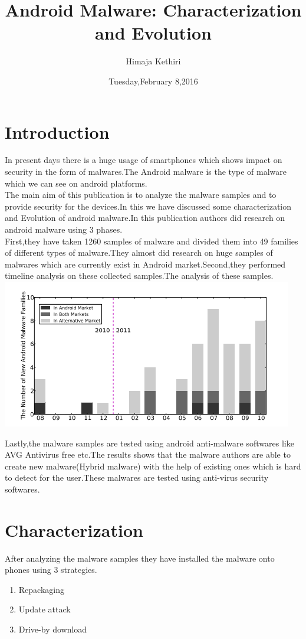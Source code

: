 \documentclass[10pt]{article}
\title{Android Malware: Characterization and Evolution}
\author{Himaja Kethiri}
\date{Tuesday,February 8,2016}
\begin{document}
\maketitle
\section{Introduction}
In present days there is a huge usage of smartphones which shows impact on security in the form of malwares.The Android malware is the type of malware which we can see on android platforms.\\

The main aim of this publication is to analyze the malware samples and to provide security for the devices.In this we have discussed some characterization and Evolution of android malware.In this publication authors did research on android malware using 3 phases.\\

First,they have taken 1260 samples of malware and divided them into 49 families of different types of malware.They almost did research on huge samples of malwares which are currently exist in Android market.Second,they performed timeline analysis on these collected samples.The analysis of these samples. \\
\includegraphics{pic.PNG}


Lastly,the malware samples are tested using android anti-malware softwares like AVG Antivirus free  etc.The results shows that the malware authors are able to create new malware(Hybrid malware) with the help of existing ones which is hard to detect for the user.These malwares are tested using anti-virus security softwares.\\

\section{Characterization}
     After analyzing the malware samples they have installed the malware onto phones using 3 strategies. 
\begin{enumerate}
\item Repackaging
\item Update attack
\item Drive-by download
\end{enumerate} 
\end{document}
